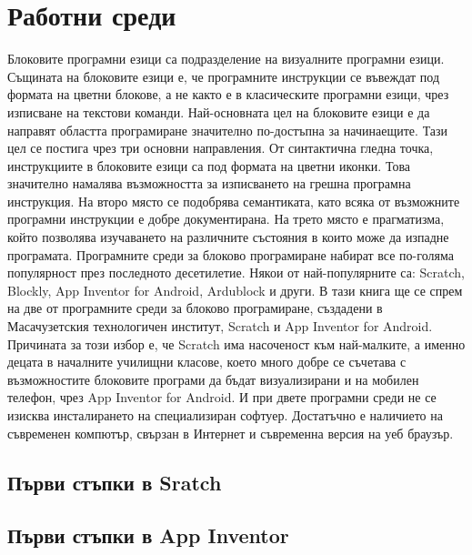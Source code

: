 ﻿\chapter{Работни среди}

Блоковите програмни езици са подразделение на визуалните програмни езици. Същината на блоковите езици е, че програмните инструкции се въвеждат под формата на цветни блокове, а не както е в класическите програмни езици, чрез изписване на текстови команди. Най-основната цел на блоковите езици е да направят областта програмиране значително по-достъпна за начинаещите. Тази цел се постига чрез три основни направления. От синтактична гледна точка, инструкциите в блоковите езици са под формата на цветни иконки. Това значително намалява възможността за изписването на грешна програмна инструкция. На второ място се подобрява семантиката, като всяка от възможните програмни инструкции е добре документирана. На трето място е прагматизма, който позволява изучаването на различните състояния в които може да изпадне програмата. Програмните среди за блоково програмиране набират все по-голяма популярност през последното десетилетие. Някои от най-популярните са: Scratch, Blockly, App Inventor for Android, Ardublock и други. В тази книга ще се спрем на две от програмните среди за блоково програмиране, създадени в Масачузетския технологичен институт, Scratch и App Inventor for Android. Причината за този избор е, че Scratch има насоченост към най-малките, а именно децата в началните училищни класове, което много добре се съчетава с възможностите блоковите програми да бъдат визуализирани и на мобилен телефон, чрез App Inventor for Android. И при двете програмни среди не се изисква инсталирането на специализиран софтуер. Достатъчно е наличието на съвременен компютър, свързан в Интернет и съвременна версия на уеб браузър. 

\section{Първи стъпки в Sratch}


\section{Първи стъпки в App Inventor}

